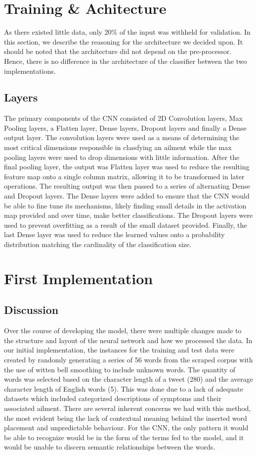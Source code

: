 \documentclass[12pt]{report}
\begin{document}
\section{Training \& Achitecture}
As there existed little data, only 20\% of the input was withheld for validation.
In this section, we describe the reasoning for the architecture we decided upon.
It should be noted that the architecture did not depend on the pre-processor.
Hence, there is no difference in the architecture of the classifier between the two implementations.

\subsection{Layers}
The primary components of the CNN consisted of 2D Convolution layers,
Max Pooling layers, a Flatten layer, Dense layers, Dropout layers and finally a Dense output layer.
The convolution layers were used as a means of determining the most critical dimensions
responsible in classfying an ailment while the max pooling layers were used to drop
dimensions with little information. After the final pooling layer, the output was
Flatten layer was used to reduce the resulting feature map onto a single column matrix, allowing it to be
transformed in later operations.
The resulting output was then passed to a series of alternating
Dense and Dropout layers. The Dense layers were added to ensure
that the CNN would  be able to fine tune its mechanisms, likely finding small details in the activation map provided
and over time, make better classifications. The Dropout layers were used to prevent overfitting
as a result of the small dataset provided. Finally, the last Dense layer was used to reduce
the learned values onto a probability distribution matching the cardinality of the classification size.

\section{First Implementation}

\subsection{Discussion}
Over the course of developing the model, there were multiple changes made to the
structure and layout of the neural network and how we processed the data. In our
initial implementation, the instances for the training and test data were created
by randomly generating a series of 56 words from the scraped corpus with the use
of witten bell smoothing to include unknown words. The quantity of words was selected
based on the character length of a tweet (280) and the average character length of
English words (5). This was done due to a lack of adequate datasets which included
categorized descriptions of symptoms and their associated ailment. There are several
inherent concerns we had with this method, the most evident being the lack of contextual
meaning behind the inserted word placement and unpredictable behaviour. For the CNN, the
only pattern it would be able to recognize would be in the form of the terms fed to the
model, and it would be unable to discern semantic relationships between the words.
\end{document}

